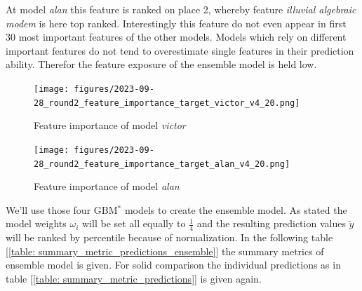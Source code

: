 \documentclass[12pt, a4paper]{article}
\begin{document}
At model \textit{alan} this feature is ranked on place 2, whereby feature \textit{illuvial algebraic modem} is here top ranked. Interestingly this feature do not even appear in first 30 most important features of the other models. Models which rely on different important features do not tend to overestimate single features in their prediction ability. Therefor the feature exposure of the ensemble model is held low.
\begin{figure}[htbp]
\begin{minipage}[t]{7cm}
\vspace{0pt}
\centering
\texttt{[image: figures/2023-09-28\_round2\_feature\_importance\_target\_victor\_v4\_20.png]}
\caption[Feature importance of model victor]{Feature importance of model \textit{victor} }
\label{fig: fi_victor}  
\end{minipage}
\hfill
\begin{minipage}[t]{7cm}
\vspace{0pt}
\centering
\texttt{[image: figures/2023-09-28\_round2\_feature\_importance\_target\_alan\_v4\_20.png]}
\caption[Feature importance of model alan]{Feature importance of model \textit{alan} }
\label{fig: fi_alan}  
\end{minipage}
\end{figure}
We'll use those four GBM$^{\ast}$ models to create the ensemble model. As stated the model weights $\omega_i$ will be set all equally to $\frac{1}{4}$ and the resulting prediction values $\tilde{y}$ will be ranked by percentile because of normalization. In the following table [\ref{table: summary_metric_predictions_ensemble}] the summary metrics of ensemble model is given. For solid comparison the individual predictions as in table [\ref{table: summary_metric_predictions}] is given again.
\end{document}
